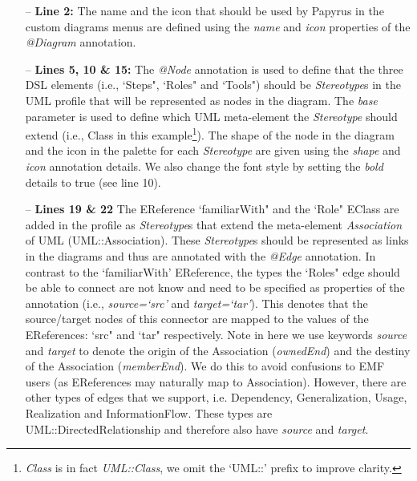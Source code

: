 \begin{itemize}
	\item[--] \textbf{Line 2:} The name and the icon that should be used by Papyrus in the custom diagrams menus are defined using the \textit{name} and \textit{icon} properties of the \textit{@Diagram} annotation.
	\item[--] \textbf{Lines 5, 10 \& 15:} The \textit{@Node} annotation is used to define that the three DSL elements (i.e., `Steps", `Roles" and `Tools") should be \textit{Stereotype}s in the UML profile that will be represented as nodes in the diagram. 
	The \textit{base} parameter is used to define which UML meta-element the \textit{Stereotype} should extend (i.e., Class %
	in this example\footnote{\textit{Class} is in fact \textit{UML::Class}, we omit the `UML::' prefix to improve clarity.}). The shape of the node in the diagram and the icon in the palette for each \textit{Stereotype} are given using the \textit{shape} and \textit{icon} annotation details. 
	We also change the font style by setting the \textit{bold} details to true (see line 10).
	\item[--] \textbf{Lines 19 \& 22} The EReference `familiarWith" and the `Role" EClass are added in the profile as \textit{Stereotype}s that extend the meta-element \textit{Association} of UML (UML::Association). 
	These \textit{Stereotype}s should be represented as links in the diagrams and thus are annotated with the \textit{@Edge} annotation.
	In contrast to the `familiarWith' EReference, the types the `Roles" edge should be able to connect are not know and need to be specified as properties of the annotation (i.e., \textit{source=`src'} and \textit{target=`tar'}). 
	This denotes that the source/target nodes of this connector are mapped to the values of the	EReferences: `src" and `tar" respectively. 
	Note in here we use keywords \textit{source} and \textit{target} to denote the origin of the Association (\textit{ownedEnd}) and the destiny of the Association (\textit{memberEnd}). 
	We do this to avoid confusions to EMF users (as EReferences may naturally map to Association). However, there are other types of edges that we support, i.e. Dependency, Generalization, Usage, Realization and InformationFlow. These types are UML::DirectedRelationship and therefore also have \textit{source} and \textit{target}.

\end{itemize}
